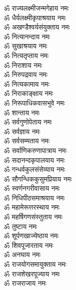 \begin{multicols}{2}
\begin{flushleft}
ॐ राज्यलक्ष्मीजन्मगेहाय नमः\hfill{}\\ %
ॐ धैर्यलक्ष्मीकृपाश्रयाय नमः\\
ॐ अखण्डैश्वर्यसंयुक्ताय नमः\\
ॐ नित्यानन्दाय नमः\\
ॐ सुखाश्रयाय नमः\\
ॐ नित्यतृप्ताय नमः\\
ॐ निराशाय नमः\\
ॐ निरुपद्रवाय नमः\\
ॐ नित्यकामाय नमः\\
ॐ निराकाङ्क्षाय नमः\\
ॐ निरूपाधिकवासभुवे नमः\hfill{}\\ %
ॐ शान्ताय नमः\\
ॐ सर्वगुणोपेताय नमः\\
ॐ सर्वज्ञाय नमः\\
ॐ सर्वसम्मताय नमः\\
ॐ सर्वाणिकरुणापात्राय नमः\\
ॐ सदानन्दकृपालयाय नमः\\
ॐ गन्धर्वकुलसंसेव्याय नमः\\
ॐ सौगन्धिककुसुमप्रियाय नमः\\
ॐ स्वर्णनगरीवासाय नमः\\
ॐ निधिपीठसमाश्रयाय नमः\hfill{}\\ %
ॐ महामेरूत्तरस्थाय नमः\\
ॐ महर्षिगणसंस्तुताय नमः\\
ॐ तुष्टाय नमः\\
ॐ शूर्पणखाज्येष्ठाय नमः\\
ॐ शिवपूजारताय नमः\\
ॐ अनघाय नमः\\
ॐ राजयोगसमायुक्ताय नमः\\
ॐ राजशेखरपूज्याय नमः\\
ॐ राजराजाय नमः\\ %
\end{flushleft}
\end{multicols}



